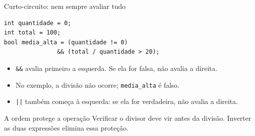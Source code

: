 \begin{frame}[fragile]{Curto-circuito: nem sempre avaliar tudo}
\begin{lstlisting}
int quantidade = 0;
int total = 100;
bool media_alta = (quantidade != 0)
               && (total / quantidade > 20);
\end{lstlisting}
\begin{itemize}
\item \texttt{\&\&} avalia primeiro a esquerda. Se ela for falsa, não avalia a direita.
\item No exemplo, a divisão não ocorre; \texttt{media\_alta} é falso.
\item \texttt{||} também começa à esquerda: se ela for verdadeira, não avalia a direita.
\end{itemize}
\begin{block}{A ordem protege a operação}
Verificar o divisor deve vir antes da divisão. Inverter as duas expressões elimina essa proteção.
\end{block}
\end{frame}
